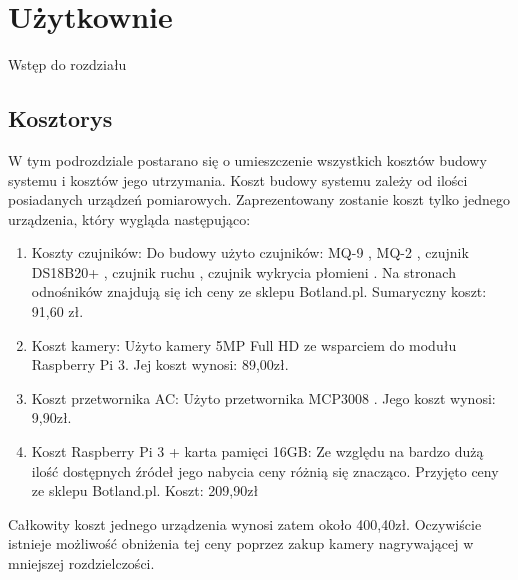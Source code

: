 \chapter{Użytkownie}

Wstęp do rozdziału

\section{Kosztorys}
W tym podrozdziale postarano się o umieszczenie wszystkich kosztów budowy systemu i kosztów jego utrzymania. Koszt budowy systemu zależy od ilości posiadanych urządzeń pomiarowych. Zaprezentowany zostanie koszt tylko jednego urządzenia, który wygląda następująco:
\begin{enumerate}
\item Koszty czujników:
Do budowy użyto czujników: MQ-9 \cite{specyfikacjaMQ-9}, MQ-2 \cite{specyfikacjaMQ-2}, czujnik DS18B20+ \cite{specyfikacjaTemp}, czujnik ruchu \cite{pir}, czujnik wykrycia płomieni \cite {specyfikacjaFlame}. Na stronach odnośników znajdują się ich ceny ze sklepu Botland.pl. Sumaryczny koszt: 91,60 zł.
\item Koszt kamery:
Użyto kamery 5MP Full HD ze wsparciem do modułu Raspberry Pi 3. Jej koszt wynosi: 89,00zł.
\item Koszt przetwornika AC:
Użyto przetwornika MCP3008 \cite{specyfikacjaAC}. Jego koszt wynosi: 9,90zł.
\item Koszt Raspberry Pi 3 + karta pamięci 16GB: 
Ze względu na bardzo dużą ilość dostępnych źródeł jego nabycia ceny różnią się znacząco. Przyjęto ceny ze sklepu Botland.pl. Koszt: 209,90zł
\end{enumerate}
Całkowity koszt jednego urządzenia wynosi zatem około 400,40zł. Oczywiście istnieje możliwość obniżenia tej ceny poprzez zakup kamery nagrywającej w mniejszej rozdzielczości.

